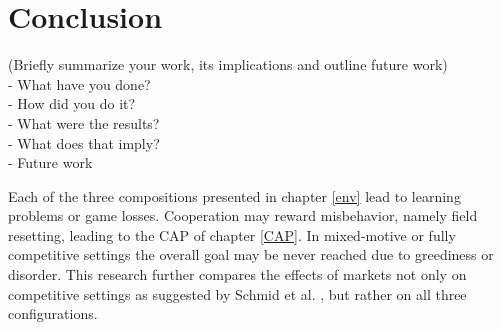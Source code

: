 %
%
\chapter{Conclusion}\label{sec:Conclusion}
(Briefly summarize your work, its implications and outline future work) \\
- What have you done? \\
- How did you do it? \\
- What were the results? \\
- What does that imply? \\
- Future work

Each of the three compositions presented in chapter \ref{env} lead to learning problems or game losses. Cooperation may reward misbehavior, namely field resetting, leading to the CAP of chapter \ref{CAP}. In mixed-motive or fully competitive settings the overall goal may be never reached due to greediness or disorder. This research further compares the effects of markets not only on competitive settings as suggested by Schmid et al. \cite{scbe21}, but rather on all three configurations.